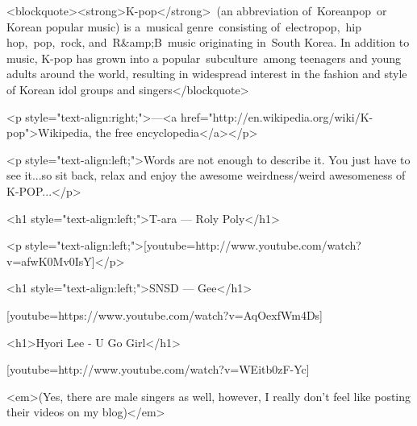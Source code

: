\begin{post}
	\begin{content}
<blockquote><strong>K-pop</strong> (an abbreviation of Koreanpop or Korean popular music) is a musical genre consisting of electropop, hip hop, pop, rock, and R&amp;B music originating in South Korea. In addition to music, K-pop has grown into a popular subculture among teenagers and young adults around the world, resulting in widespread interest in the fashion and style of Korean idol groups and singers</blockquote>

<p style="text-align:right;">—<a href="http://en.wikipedia.org/wiki/K-pop">Wikipedia, the free encyclopedia</a></p>

<p style="text-align:left;">Words are not enough to describe it. You just have to see it...so sit back, relax and enjoy the awesome weirdness/weird awesomeness of K-POP...</p>



<h1 style="text-align:left;">T-ara — Roly Poly</h1>

<p style="text-align:left;">[youtube=http://www.youtube.com/watch?v=afwK0Mv0IsY]</p>



<h1 style="text-align:left;">SNSD — Gee</h1>

[youtube=https://www.youtube.com/watch?v=AqOexfWm4Ds]

<h1>Hyori Lee - U Go Girl</h1>

[youtube=http://www.youtube.com/watch?v=WEitb0zF-Yc]



<em>(Yes, there are male singers as well, however, I really don't feel like posting their videos on my blog)</em>
	\end{content}
\end{post}
